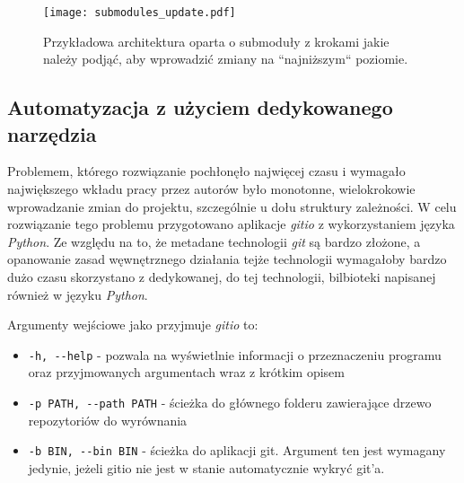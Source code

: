 \begin{figure}[H]
    \centering
    \texttt{[image: submodules\_update.pdf]}
    \caption{Przykładowa architektura oparta o submoduły z krokami jakie należy podjąć, aby wprowadzić zmiany na ``najniższym`` poziomie.}
    \label{fig:submodules_update}
\end{figure}


\subsection{Automatyzacja z użyciem dedykowanego narzędzia}
\label{subsec:gitio}

Problemem, którego rozwiązanie pochłonęło najwięcej czasu i wymagało największego wkładu pracy przez autorów było monotonne, wielokrokowie wprowadzanie zmian do projektu, szczególnie u dołu struktury zależności. W celu rozwiązanie tego problemu przygotowano aplikacje \emph{gitio} z wykorzystaniem języka \emph{Python}. Ze względu na to, że metadane technologii \emph{git} są bardzo złożone, a opanowanie zasad węwnętrznego działania tejże technologii wymagałoby bardzo dużo czasu skorzystano z dedykowanej, do tej technologii, bilbioteki napisanej również w języku \emph{Python}.

Argumenty wejściowe jako przyjmuje \emph{gitio} to:
\begin{itemize}
    \item \lstinline{-h, --help} - pozwala na wyświetlnie informacji o przeznaczeniu programu oraz przyjmowanych argumentach wraz z krótkim opisem
    \item \lstinline{-p PATH, --path PATH} - ścieżka do głównego folderu zawierające drzewo repozytoriów do wyrównania
    \item \lstinline{-b BIN, --bin BIN} - ścieżka do aplikacji git. Argument ten jest wymagany jedynie, jeżeli gitio nie jest w stanie automatycznie wykryć git'a.
\end{itemize}

